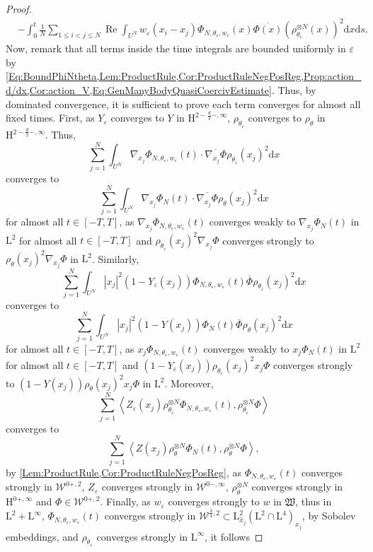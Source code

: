 \documentclass{article}
\def\W{\mathcal W}
\def\L{\mathrm L}
\def\H{\mathrm H}
\def\eps{\varepsilon}
\DeclareMathOperator{\re}{Re}
\def\d{\mathrm{d}}
\theoremstyle{definition}
\numberwithin{equation}{section}
\begin{document}
\begin{proof}
\begin{align*}
        &- \int_0^t\frac{1}{N}\sum_{1\leqslant i<j\leqslant N}\re\int_{U^N} w_\eps(x_i-x_j)\Phi_{N,\theta_{\eps},w_\eps}(x)\overline{\Phi(x)}\left(\rho_{\theta_\eps}^{\otimes N}(x)\right)^2 \d x\d s.
    \end{align*}
    Now, remark that all terms inside the time integrals are bounded uniformly in $\eps$ by \cref{Eq:BoundPhiNtheta,Lem:ProductRule,Cor:ProductRuleNegPosReg,Prop:action_d/dx,Cor:action_V,Eq:GenManyBodyQuasiCoercivEstimate}. Thus, by dominated convergence, it is sufficient to prove each term converges for almost all fixed times. First, as $Y_\eps$ converges to $Y$ in $\H^{2-\frac{d}{2}-,\infty}$, $\rho_{\theta_\eps}$ converges to $\rho_{\theta}$ in $\H^{2-\frac{d}{2}-,\infty}$. Thus,
    $$\sum_{j=1}^N \int_{U^N}\nabla_{x_j}\Phi_{N,\theta_\eps,w_\eps}(t)\cdot\overline{\nabla_{x_j}\Phi}\rho_{\theta_\eps}(x_j)^2\d x $$
    converges to 
    $$\sum_{j=1}^N \int_{U^N}\nabla_{x_j}\Phi_{N}(t)\cdot\overline{\nabla_{x_j}\Phi}\rho_{\theta}(x_j)^2\d x $$
    for almost all $t\in[-T,T]$, as $\nabla_{x_j}\Phi_{N,\theta_\eps,w_\eps}(t)$ converges weakly to $\nabla_{x_j}\Phi_{N}(t)$ in $\L^2$ for almost all $t\in[-T,T]$ and $\rho_{\theta_\eps}(x_j)^2 \nabla_{x_j} \Phi$ converges strongly to $\rho_{\theta}(x_j)^2 \nabla_{x_j} \Phi$ in $\L^2$. Similarly,
    $$\sum_{j=1}^N \int_{U^N}|x_j|^2(1-Y_\eps(x_j))\Phi_{N,\theta_\eps,w_\eps}(t)\overline{\Phi}\rho_{\theta_\eps}(x_j)^2\d x $$
    converges to 
    $$\sum_{j=1}^N \int_{U^N}|x_j|^2(1-Y(x_j))\Phi_{N}(t)\overline{\Phi}\rho_{\theta}(x_j)^2\d x $$
    for almost all $t\in[-T,T]$, as $x_j\Phi_{N,\theta_\eps,w_\eps}(t)$ converges weakly to $x_j\Phi_{N}(t)$ in $\L^2$ for almost all $t\in[-T,T]$ and $(1-Y_{\eps}(x_j))\rho_{\theta_\eps}(x_j)^2 x_j \Phi$ converges strongly to $(1-Y(x_j))\rho_{\theta}(x_j)^2 x_j \Phi$ in $\L^2$. Moreover, 
    $$ \sum_{j=1}^N \left\langle Z_{\eps}(x_j) \rho_{\theta_\eps}^{\otimes N}\Phi_{N,\theta_\eps,w_\eps}(t), \rho_{\theta_\eps}^{\otimes N}\Phi\right\rangle$$
    converges to
    $$ \sum_{j=1}^N \left\langle Z(x_j) \rho_{\theta}^{\otimes N}\Phi_{N}(t), \rho_{\theta}^{\otimes N}\Phi\right\rangle,$$
    by \cref{Lem:ProductRule,Cor:ProductRuleNegPosReg}, as $\Phi_{N,\theta_\eps,w_\eps}(t)$ converges strongly in $\W^{0+,2}$, $Z_\eps$ converges strongly in $\W^{0-,\infty}$, $\rho_{\theta}^{\otimes N}$ converges strongly in $\H^{0+,\infty}$ and $\Phi\in\W^{0+,2}$. Finally, as $w_\eps$ converges strongly to $w$ in $\mathfrak{W}$, thus in $\L^2+\L^\infty$, $\Phi_{N,\theta_\eps,w_\eps}(t)$ converges strongly in $\W^{\frac{3}{4},2}\subset\L^2_{\hat{x}_j}(\L^2\cap\L^4)_{x_j}$, by Sobolev embeddings, and $\rho_{\theta_\eps}$ converges strongly in $\L^\infty$, it follows

\end{proof}
\end{document}
